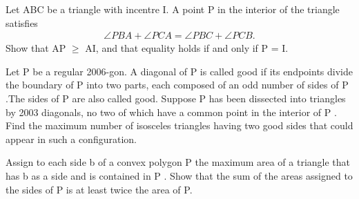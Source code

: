 \item Let ABC be a triangle with incentre I. A point P in the interior of the
triangle satisfies
\begin{align*}
\angle PBA + \angle PCA = \angle PBC + \angle PCB.
\end{align*}
Show that AP $\geq$ AI, and that equality holds if and only if P = I.

\item Let P be a regular 2006-gon. A diagonal of P is called good if its endpoints divide the boundary of P into two parts, each composed of an odd number of sides of P .The sides of P are also called good.
Suppose P has been dissected into triangles by 2003 diagonals, no two of which have a common point in the interior of P . Find the maximum number of isosceles triangles having two good sides that could appear in such a configuration.

\item Assign to each side b of a convex polygon P the maximum area of a triangle that has b as a side and is contained in P . Show that the sum of the areas assigned to the sides of P is at least twice the area of P.
